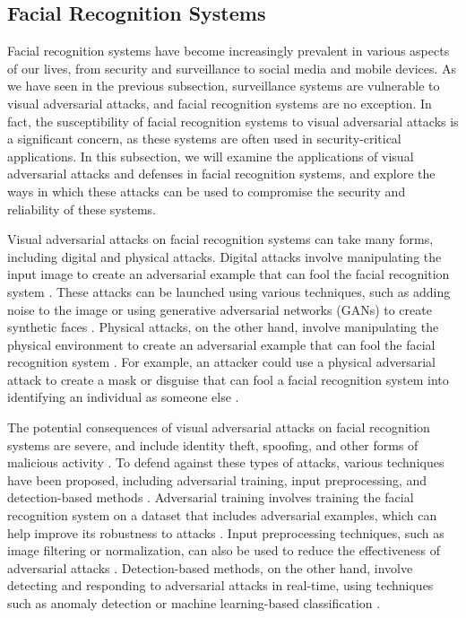 \documentclass[11pt]{article}
\begin{document}
\subsection{Facial Recognition Systems}

Facial recognition systems have become increasingly prevalent in various aspects of our lives, from security and surveillance to social media and mobile devices. As we have seen in the previous subsection, surveillance systems are vulnerable to visual adversarial attacks, and facial recognition systems are no exception. In fact, the susceptibility of facial recognition systems to visual adversarial attacks is a significant concern, as these systems are often used in security-critical applications. In this subsection, we will examine the applications of visual adversarial attacks and defenses in facial recognition systems, and explore the ways in which these attacks can be used to compromise the security and reliability of these systems.

Visual adversarial attacks on facial recognition systems can take many forms, including digital and physical attacks. Digital attacks involve manipulating the input image to create an adversarial example that can fool the facial recognition system \cite{ref214}. These attacks can be launched using various techniques, such as adding noise to the image or using generative adversarial networks (GANs) to create synthetic faces \cite{ref215}. Physical attacks, on the other hand, involve manipulating the physical environment to create an adversarial example that can fool the facial recognition system \cite{ref36}. For example, an attacker could use a physical adversarial attack to create a mask or disguise that can fool a facial recognition system into identifying an individual as someone else \cite{ref216}.

The potential consequences of visual adversarial attacks on facial recognition systems are severe, and include identity theft, spoofing, and other forms of malicious activity \cite{ref217}. To defend against these types of attacks, various techniques have been proposed, including adversarial training, input preprocessing, and detection-based methods \cite{ref6}. Adversarial training involves training the facial recognition system on a dataset that includes adversarial examples, which can help improve its robustness to attacks \cite{ref218}. Input preprocessing techniques, such as image filtering or normalization, can also be used to reduce the effectiveness of adversarial attacks \cite{ref128}. Detection-based methods, on the other hand, involve detecting and responding to adversarial attacks in real-time, using techniques such as anomaly detection or machine learning-based classification \cite{ref219}.
\end{document}

